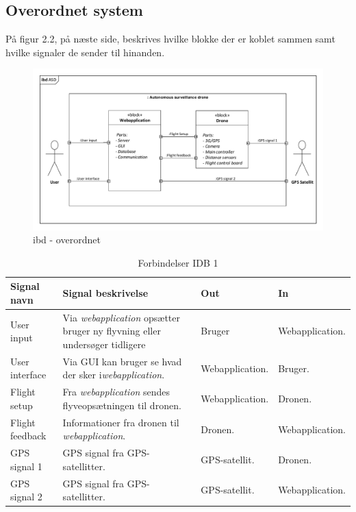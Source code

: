 \subsection{Overordnet system}

På figur 2.2, på næste side, beskrives hvilke blokke der er koblet sammen samt hvilke
signaler de sender til hinanden.

\begin{figure}[H]
\centering
\includegraphics[width=1\textwidth]{Billeder/IBD/ibd1_overordnet.pdf}
\caption{ibd - overordnet}
\label{fig:ibd_overordnet}
\end{figure}

\begin{table}[H]
	\centering
		\begin{tabular}{|p{2.5 cm}|p{5.5 cm}|p{2.5 cm}|p{2.5 cm}|} 
		\hline
			\textbf{Signal navn} 	& \textbf{Signal beskrivelse}		& \textbf{Out} 				& \textbf{In}     \\ \hline
			User input 			& Via \textit{webapplication} opsætter bruger ny flyvning eller undersøger tidligere & Bruger 		& Webapplication.			    \\ \hline
			User interface 		& Via GUI kan bruger se hvad der sker i\textit{webapplication}.	& Webapplication.			& Bruger.				\\ \hline
			Flight setup		& Fra \textit{webapplication} sendes flyveopsætningen til dronen.	& Webapplication.	& Dronen.	\\ \hline
			Flight feedback		& Informationer fra dronen til \textit{webapplication}.	& 	Dronen.		& Webapplication.			    \\ \hline
			GPS signal 1		& GPS signal fra GPS-satellitter.	& GPS-satellit.			& Dronen.				\\ \hline
			GPS signal 2		& GPS signal fra GPS-satellitter.	& GPS-satellit.				& Webapplication.	\\ \hline  
		\end{tabular}
	\caption{Forbindelser IDB 1}
	\label{tab:IDB1}
\end{table}

